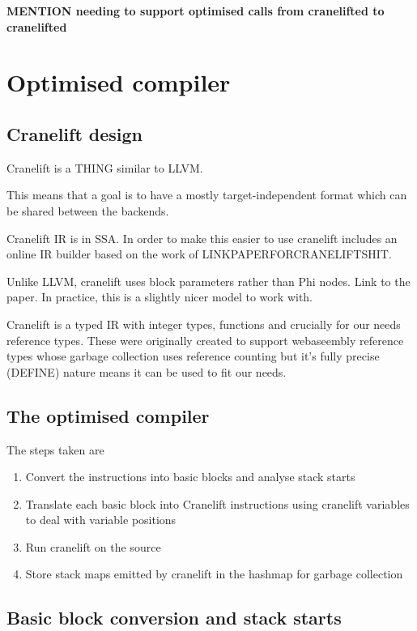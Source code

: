\textbf{MENTION needing to support optimised calls from cranelifted to cranelifted}

\section{Optimised compiler}

\subsection{Cranelift design}

Cranelift is a THING similar to LLVM.

This means that a goal is to have a mostly target-independent format which can be shared between
the backends.

Cranelift IR is in SSA. In order to make this easier to use cranelift includes an online IR builder
based on the work of LINKPAPERFORCRANELIFTSHIT.

Unlike LLVM, cranelift uses block parameters rather than Phi nodes. Link to the paper. In practice,
this is a slightly nicer model to work with.

Cranelift is a typed IR with integer types, functions and crucially for our needs reference types.
These were originally created to support webaseembly reference types whose garbage collection uses
reference counting but it's fully precise (DEFINE) nature means it can be used to fit our needs.

\subsection{The optimised compiler}

The steps taken are

\begin{enumerate}
    \item Convert the instructions into basic blocks and analyse stack starts
    \item Translate each basic block into Cranelift instructions using cranelift variables to deal
          with variable positions
    \item Run cranelift on the source
    \item Store stack maps emitted by cranelift in the hashmap for garbage collection
\end{enumerate}

\subsection{Basic block conversion and stack starts}

